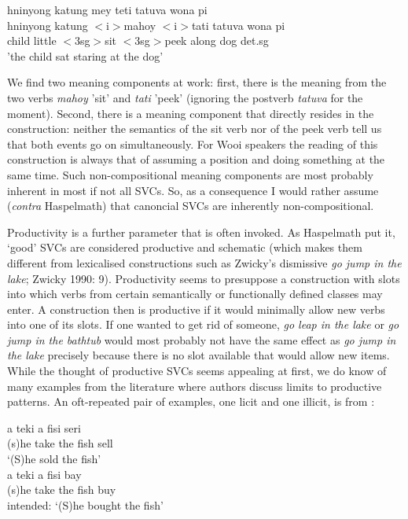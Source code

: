 \ea \label{}
\glll hninyong katung mey teti tatuva wona pi \\
hninyong katung $<$i$>$mahoy $<$i$>$tati tatuva wona pi \\
 child little $<$\acs{3}\acs{sg}$>$sit $<$\acs{3}\acs{sg}$>$peek along dog \acs{det}.\acs{sg} \\
\glft 'the child sat staring at the dog' \\ 
\z
\xe

We find two meaning components at work: first, there is the meaning from the two verbs \textit{mahoy} 'sit' and \textit{tati} 'peek' (ignoring the postverb \textit{tatuva} for the moment). Second, there is a meaning component that directly resides in the construction: neither the semantics of the sit verb nor of the peek verb tell us that both events go on simultaneously. For Wooi speakers the reading of this construction is always that of assuming a position and doing something at the same time. Such non-compositional meaning components are most probably inherent in most if not all SVCs. So, as a consequence I would rather assume (\textit{contra} Haspelmath) that canoncial SVCs are inherently non-compositional.

Productivity is a further parameter that is often invoked. As Haspelmath put it, `good' SVCs are considered productive and schematic (which makes them different from lexicalised constructions such as Zwicky's dismissive \textit{go jump in the lake}; Zwicky 1990: 9). Productivity seems to presuppose a construction with slots into which verbs from certain semantically or functionally defined classes may enter. A construction then is productive if it would minimally allow new verbs into one of its slots. If one wanted to get rid of someone, \textit{go leap in the lake} or \textit{go jump in the bathtub} would most probably not have the same effect as \textit{go jump in the lake} precisely because there is no slot available that would allow new items. While the thought of productive SVCs seems appealing at first, we do know of many examples from the literature where authors discuss limits to productive patterns. An oft-repeated pair of examples, one licit and one illicit, is from \textcite{sebba1987syntax}:

\pex \label{}
\a
\gll a teki a fisi seri \\
(s)he take the fish sell \\
\glft `(S)he sold the fish' \\ 
\z
\a
\gla *a teki a fisi bay \\ 
(s)he take the fish buy \\
\glft intended: `(S)he bought the fish' \\ 
\z
\xe

